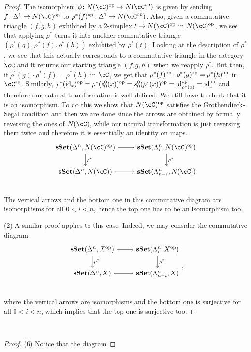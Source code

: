 \documentclass[a4paper,11pt,openany]{scrartcl}
\begin{document}
\begin{proof}
    The isomorphism $\phi\colon N(\cC)^{\op}\rightarrow N(\cC^{\op})$ is given
    by sending $f\colon\Delta^1\rightarrow N(\cC)^{\op}$ to
    $\rho^*(f)^{\op}\colon\Delta^1\rightarrow N(\cC^{\op})$. Also, given a
    commutative triangle $(f,g,h)$ exhibited by a 2-simplex $t\rightarrow
    N(\cC)^{\op}$ in $N(\cC)^{\op}$, we see that applying
    $\rho^*$ turns it into another commutative triangle
    $(\rho^*(g),\rho^*(f),\rho^*(h))$ exhibited by $\rho^*(t)$. Looking at the
    description of $\rho^*$, we see that this actually corresponds to a
    commutative triangle in the category $\cC$ and it returns our starting
    triangle $(f,g,h)$ when we reapply $\rho^*$. But then, if
    $\rho^*(g)\cdot\rho^*(f)=\rho^*(h)$ in $\cC$, we get that
    $\rho^*(f)^{\operatorname{op}}\cdot\rho^*(g)^{\operatorname{op}}=\rho^*(h)^{\operatorname{op}}$ in $\cC^{\op}$.
    Similarly,
    $\rho^*(\operatorname{id}_x)^{\operatorname{op}}=\rho^*(s^0_0(x))^{\operatorname{op}}=s^0_0(\rho^*(x))^{\operatorname{op}}=\operatorname{id}_{\rho^*(x)}^{\operatorname{op}}=\operatorname{id}_x^{\operatorname{op}}$
    and therefore our natural transformation is well defined.
    We still have to check that it is an isomorphism. To do this we show that
    $N(\cC)^{\op}$ satisfies the Grothendieck-Segal condition and then we are
    done since the arrows are obtained by formally reversing the ones of
    $N(\cC)$, while our natural transformation is just reversing them twice and
    therefore it is essentially an identity on maps.
    \[
        \begin{tikzcd}
            \sSet(\Delta^n,N(\cC)^{\op})\ar[r]\ar[d, "\rho^*"]
            & \sSet(\Lambda_i^n,N(\cC)^{\op})\ar[d, "\rho^*"] \\
            \sSet(\Delta^n,N(\cC))\ar[r]
            & \sSet(\Lambda_{n-i}^n,N(\cC)) \\
        \end{tikzcd}
    \]
    The vertical arrows and the bottom one in this commutative diagram are
    isomorphisms for all $0<i<n$, hence the top one has to be an isomorphism
    too.

    (2) A similar proof applies to this case. Indeed, we may consider the
    commutative diagram
    \[
        \begin{tikzcd}
            \sSet(\Delta^n,X^{\op})\ar[r]\ar[d, "\rho^*"]
            & \sSet(\Lambda_i^n,X^{\op})\ar[d, "\rho^*"] \\
            \sSet(\Delta^n,X)\ar[r]
            & \sSet(\Lambda_{n-i}^n,X) \\
        \end{tikzcd},
    \]
    where the vertical arrows are isomorphisms and the bottom one is surjective
    for all $0<i<n$, which implies that the top one is surjective too.
\end{proof}

~\\
\begin{proof}
    (6) Notice that the diagram 
\end{proof}
\end{document}
